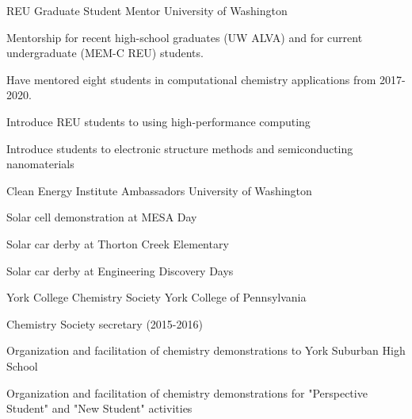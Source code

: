 

\begin{cventries}

\cventry
  {}
  {REU Graduate Student Mentor} %
  {University of Washington} %
  {}
  {
    \begin{cvitems}
      \item{Mentorship for recent high-school graduates (UW ALVA) and for current undergraduate (MEM-C REU) students.}
      \item{Have mentored eight students in computational chemistry applications from 2017-2020.}
      \item{Introduce REU students to using high-performance computing}
      \item{Introduce students to electronic structure methods and semiconducting nanomaterials}
    \end{cvitems}
  }

\cventry
  {}
  {Clean Energy Institute Ambassadors} %
  {University of Washington} %
  {}
  {
    \begin{cvitems}
      \item{Solar cell demonstration at MESA Day}
      \item{Solar car derby at Thorton Creek Elementary}
      \item{Solar car derby at Engineering Discovery Days}
    \end{cvitems}
  }


\cventry
  {}
  {York College Chemistry Society} %
  {York College of Pennsylvania} %
  {}
  {
    \begin{cvitems}
      \item{Chemistry Society secretary (2015-2016)}
      \item{Organization and facilitation of chemistry demonstrations to York Suburban High School}
      \item{Organization and facilitation of chemistry demonstrations for "Perspective Student" and "New Student" activities}
    \end{cvitems}
  }



\end{cventries}
